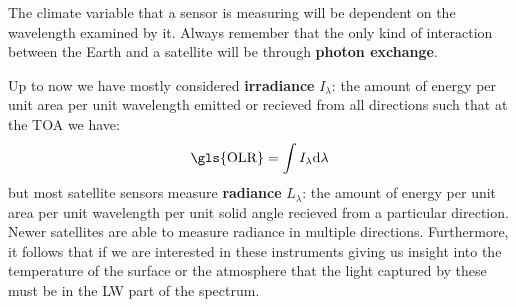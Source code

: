 \noindent The climate variable that a sensor is measuring will be dependent on 
the wavelength examined by it. Always remember that the only kind of interaction
between the Earth and a satellite will be through \textbf{photon exchange}.

Up to now we have mostly considered \textbf{irradiance} $I_\lambda$: the amount
of energy per unit area per unit wavelength emitted or recieved from all directions
such that at the \gls{TOA} we have:
$$
\text{\gls{OLR}} = \int I_\lambda \text{d}\lambda
$$
but most satellite sensors measure \textbf{radiance} $L_\lambda$: the amount of
energy per unit area per unit wavelength per unit solid angle recieved from a
particular direction. Newer satellites are able to measure radiance in multiple
directions. Furthermore, it follows that if we are interested in these instruments
giving us insight into the temperature of the surface or the atmosphere that 
the light captured by these must be in the \gls{LW} part of the spectrum.

